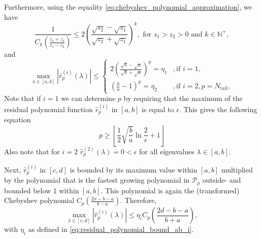 Furthermore, using the equality \cref{eq:chebyshev_polynomial_approximation}, we have
\begin{equation}
    \frac{1}{C_{k}\left(\frac{z_1 + z_2}{z_1 - z_2}\right)} \leq 2 \left(\frac{\sqrt{z_2} - \sqrt{z_1}}{\sqrt{z_2} + \sqrt{z_1}}\right)^k, \text{ for } z_1 > z_2 > 0 \text{ and } k \in \mathbb{N}^+,
    \label{eq:chebyshev_polynomial_bound}
\end{equation}
and
\begin{equation}
    \max_{\lambda \in [a,b]} |\hat{r}^{(i)}_p(\lambda)| \leq
    \begin{cases}
        2\left(\frac{\sqrt{b}-\sqrt{a}}{\sqrt{b}+\sqrt{a}}\right)^p=\eta_1 &, \text{if } i = 1,\\
        \left(\frac{b}{a}-1\right)^p=\eta_2 &, \text{if } i = 2, p = N_{\text{tail}},
    \end{cases}
    \label{eq:residual_polynomial_bound_ab_i}
\end{equation}
Note that if $i=1$ we can determine $p$ by requiring that the maximum of the residual polynomial function $\hat{r}^{(i)}_p$ in $[a,b]$ is equal to $\epsilon$. This gives the following equation
\begin{equation}
    p \geq \left\lfloor\frac{1}{2}\sqrt{\frac{b}{a}}\ln{\frac{2}{\epsilon}} + 1\right\rfloor
    \label{eq:chebyshev_degree_p}
\end{equation}
Also note that for $i=2$ $\hat{r}^{(2)}_p(\lambda) = 0 < \epsilon$ for all eigenvalues $\lambda \in [a,b]$.

Next, $\hat{r}^{(i)}_p$ in $[c,d]$ is bounded by its maximum value within $[a,b]$ multiplied by the polynomial that is the fastest growing polynomial in $\mathcal{P}_{p}$ outside- and bounded below 1 within $[a,b]$. This polynomial is again the (transformed) Chebyshev polynomial $C_{p}\left(\frac{2x - b - a}{b - a}\right)$. Therefore,
\begin{equation*}
    \max_{\lambda \in [c,d]} |\hat{r}^{(i)}_p(\lambda)| \leq \eta_i C_{p}\left(\frac{2d - b - a}{b + a}\right),
\end{equation*}
with $\eta_i$ as defined in \cref{eq:residual_polynomial_bound_ab_i}.

